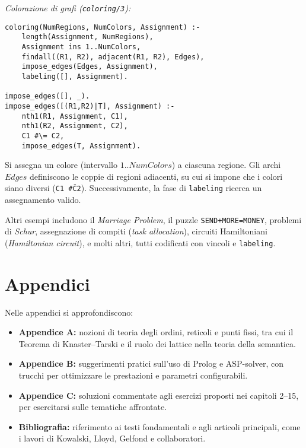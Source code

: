 \documentclass[12pt]{article}
\begin{document}
\emph{Colorazione di grafi (\texttt{coloring/3}):}
\begin{verbatim}
coloring(NumRegions, NumColors, Assignment) :-
    length(Assignment, NumRegions),
    Assignment ins 1..NumColors,
    findall((R1, R2), adjacent(R1, R2), Edges),
    impose_edges(Edges, Assignment),
    labeling([], Assignment).

impose_edges([], _).
impose_edges([(R1,R2)|T], Assignment) :-
    nth1(R1, Assignment, C1),
    nth1(R2, Assignment, C2),
    C1 #\= C2,
    impose_edges(T, Assignment).
\end{verbatim}
Si assegna un colore (intervallo $1..NumColors$) a ciascuna regione. Gli archi $Edges$ definiscono le coppie di regioni adiacenti, su cui si impone che i colori siano diversi (\texttt{C1 \#\= C2}). Successivamente, la fase di \texttt{labeling} ricerca un assegnamento valido.

Altri esempi includono il \emph{Marriage Problem}, il puzzle \texttt{SEND+MORE=MONEY}, problemi di \emph{Schur}, assegnazione di compiti (\emph{task allocation}), circuiti Hamiltoniani (\emph{Hamiltonian circuit}), e molti altri, tutti codificati con vincoli e \texttt{labeling}.

\section*{Appendici}

Nelle appendici si approfondiscono:
\begin{itemize}
  \item \textbf{Appendice A:} nozioni di teoria degli ordini, reticoli e punti fissi, tra cui il Teorema di Knaster–Tarski e il ruolo dei lattice nella teoria della semantica.
  \item \textbf{Appendice B:} suggerimenti pratici sull'uso di Prolog e ASP-solver, con trucchi per ottimizzare le prestazioni e parametri configurabili.
  \item \textbf{Appendice C:} soluzioni commentate agli esercizi proposti nei capitoli 2--15, per esercitarsi sulle tematiche affrontate.
  \item \textbf{Bibliografia:} riferimento ai testi fondamentali e agli articoli principali, come i lavori di Kowalski, Lloyd, Gelfond e collaboratori.
\end{itemize}
\end{document}
